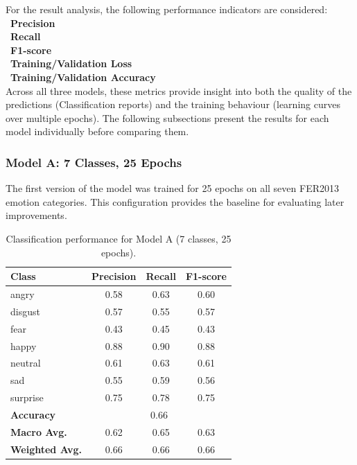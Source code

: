 \documentclass[12pt,a4paper]{article}
\begin{document}
For the result analysis, the following performance indicators are considered: \\
\textbullet\ \textbf{Precision} \\
\textbullet\ \textbf{Recall} \\
\textbullet\ \textbf{F1-score} \\
\textbullet\ \textbf{Training/Validation Loss} \\
\textbullet\ \textbf{Training/Validation Accuracy} \\[6pt]

Across all three models, these metrics provide insight into both the quality of the predictions
(Classification reports) and the training behaviour
(learning curves over multiple epochs).  
The following subsections present the results for each model individually before comparing them.

\subsubsection*{Model A: 7 Classes, 25 Epochs}

The first version of the model was trained for 25 epochs on all seven FER2013 emotion categories.
This configuration provides the baseline for evaluating later improvements.

\begin{table}[H]
\centering
\begin{tabular}{lccc}
\toprule
\textbf{Class} & \textbf{Precision} & \textbf{Recall} & \textbf{F1-score} \\
\midrule
angry    & 0.58 & 0.63 & 0.60 \\
disgust  & 0.57 & 0.55 & 0.57 \\
fear     & 0.43 & 0.45 & 0.43 \\
happy    & 0.88 & 0.90 & 0.88 \\
neutral  & 0.61 & 0.63 & 0.61 \\
sad      & 0.55 & 0.59 & 0.56 \\
surprise & 0.75 & 0.78 & 0.75 \\
\midrule
\textbf{Accuracy}      & \multicolumn{3}{c}{0.66} \\
\textbf{Macro Avg.}    & 0.62 & 0.65 & 0.63 \\
\textbf{Weighted Avg.} & 0.66 & 0.66 & 0.66 \\
\bottomrule
\end{tabular}
\caption{Classification performance for Model A (7 classes, 25 epochs).}
\end{table}
\end{document}
